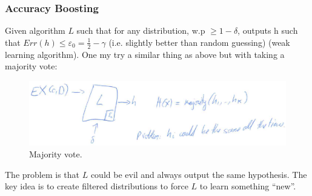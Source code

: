 \documentclass[12pt, letterpaper]{article}
\numberwithin{equation}{section} %
\newcommand{\ve}{\varepsilon}
\theoremstyle{definition}
\theoremstyle{remark}
\begin{document}
\subsubsection{Accuracy Boosting}
Given algorithm $L$ such that for any distribution, w.p $\geq 1-\delta$, outputs h such that $Err(h) \leq \ve_0 = \frac12 - \gamma$ (i.e. slightly better than random guessing) (weak learning algorithm). One my try a similar thing as above but with taking a majority vote:
\begin{figure}[H]
\centering
\includegraphics[width=0.6\linewidth]{img/majority.png}
\caption{Majority vote.}
\end{figure}
The problem is that $L$ could be evil and always output the same hypothesis. The key idea is to create filtered distributions to force $L$ to learn something ``new''.
\end{document}
